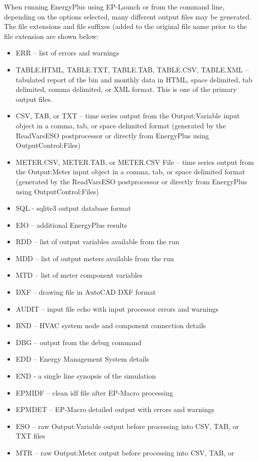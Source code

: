 When running EnergyPlus using EP-Launch or from the command line,
depending on the options selected, many different output files may
be generated. The file extensions and file suffixes (added to the
original file name prior to the file extension are shown below:
\begin{itemize}
\item ERR -- list of errors and warnings
\item TABLE.HTML, TABLE.TXT, TABLE.TAB, TABLE.CSV, TABLE.XML -- tabulated
report of the bin and monthly data in HTML, space delimited, tab delimited,
comma delimited, or XML format. This is one of the primary output
files.
\item CSV, TAB, or TXT -- time series output from the Output:Variable input
object in a comma, tab, or space delimited format (generated by the
ReadVarsESO postprocessor or directly from EnergyPlus using OutputControl:Files)
\item METER.CSV, METER.TAB, or METER.CSV File -- time series output from
the Output:Meter input object in a comma, tab, or space delimited
format (generated by the ReadVarsESO postprocessor or directly from EnergyPlus using OutputControl:Files)
\item SQL - sqlite3 output database format
\item EIO -- additional EnergyPlus results
\item RDD -- list of output variables available from the run
\item MDD -- list of output meters available from the run
\item MTD -- list of meter component variables
\item DXF -- drawing file in AutoCAD DXF format
\item AUDIT -- input file echo with input processor errors and warnings
\item BND -- HVAC system node and component connection details
\item DBG -- output from the debug command
\item EDD -- Energy Management System details
\item END - a single line synopsis of the simulation
\item EPMIDF -- clean idf file after EP-Macro processing
\item EPMDET -- EP-Macro detailed output with errors and warnings
\item ESO -- raw Output:Variable output before processing into CSV, TAB,
or TXT files
\item MTR -- raw Output:Meter output before processing into CSV, TAB, or

\end{itemize}
